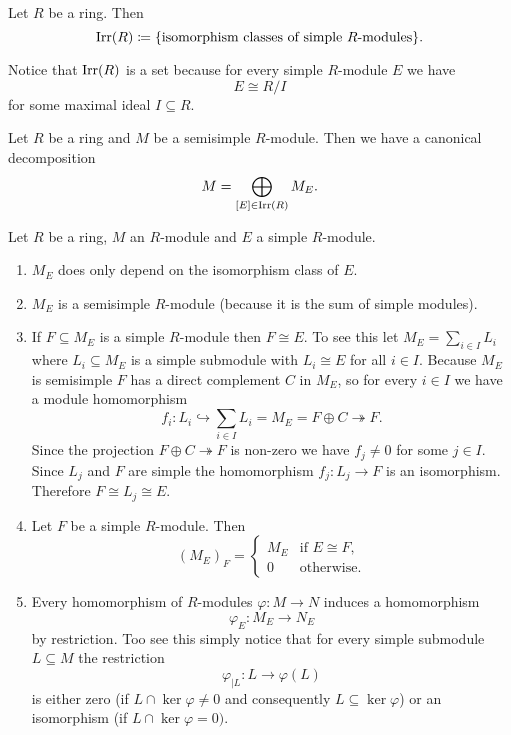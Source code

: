 \begin{defi}
 Let $R$ be a ring. Then
 \[
  \operatorname{Irr}(R) \coloneqq \{\text{isomorphism classes of simple $R$-modules}\}.
 \]
\end{defi}


Notice that $\operatorname{Irr}(R)$ is a set because for every simple $R$-module $E$ we have
\[
 E \cong R/I
\]
for some maximal ideal $I \subseteq R$.


\begin{cor}\label{cor: canonical decomposition semisimple module}
 Let $R$ be a ring and $M$ be a semisimple $R$-module. Then we have a canonical decomposition
 \[
  M = \bigoplus_{[E] \in \operatorname{Irr}(R)} M_E.
 \]
\end{cor}


\begin{rem}
  Let $R$ be a ring, $M$ an $R$-module and $E$ a simple $R$-module.
 \begin{enumerate}[label=\emph{\alph*})]
  \item
  $M_E$ does only depend on the isomorphism class of $E$.
  \item
  $M_E$ is a semisimple $R$-module (because it is the sum of simple modules).
  \item
  If $F \subseteq M_E$ is a simple $R$-module then $F \cong E$. To see this let $M_E = \sum_{i \in I} L_i$ where $L_i \subseteq M_E$ is a simple submodule with $L_i \cong E$ for all $i \in I$. Because $M_E$ is semisimple $F$ has a direct complement $C$ in $M_E$, so for every $i \in I$ we have a module homomorphism
  \[
   f_i \colon L_i \hookrightarrow \sum_{i \in I} L_i = M_E = F \oplus C \twoheadrightarrow F.
  \]
  Since the projection $F \oplus C \twoheadrightarrow F$ is non-zero we have $f_j \neq 0$ for some $j \in I$. Since $L_j$ and $F$ are simple the homomorphism $f_j \colon L_j \to F$ is an isomorphism. Therefore $F \cong L_j \cong E$.
  \item
  Let $F$ be a simple $R$-module. Then
  \[
   (M_E)_F =
   \begin{cases}
    M_E & \text{if } E \cong F, \\
      0 & \text{otherwise}.
   \end{cases}
  \]
  \item
  Every homomorphism of $R$-modules $\varphi \colon M \to N$ induces a homomorphism
  \[
   \varphi_E \colon M_E \to N_E
  \]
  by restriction. Too see this simply notice that for every simple submodule $L \subseteq M$ the restriction
  \[
   \varphi_{|L} \colon L \to \varphi(L)
  \]
  is either zero (if $L \cap \ker \varphi \neq 0$ and consequently $L \subseteq \ker \varphi$) or an isomorphism (if $L \cap \ker \varphi = 0)$.

\end{enumerate}
\end{rem}

